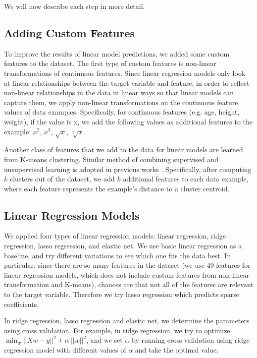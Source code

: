 \documentclass[english]{article}
\begin{document}
We will now describe each step in more detail.

\subsection{Adding Custom Features}

To improve the results of linear model predictions, we added some custom features to the dataset.
The first type of custom features is non-linear transformations of continuous features.
Since linear regression models only look at linear relationships between the target variable and feature, in order to reflect non-linear relationships in the data in linear ways so that linear models can capture them, we apply non-linear transformations on the continuous feature values of data examples.
Specifically, for continuous features (e.g. age, height, weight), if the value is x, we add the following values as additional features to the example: $x^2$, $x^3$, $\sqrt{x}$, $\sqrt[3]{x}$.

Another class of features that we add to the data for linear models are learned from K-means clustering.
Similar method of combining supervised and unsupervised learning is adopted in previous works \cite{coates2011analysis}.
Specifically, after computing $k$ clusters out of the dataset, we add $k$ additional features to each data example, where each feature represents the example's distance to a cluster centroid.

\subsection{Linear Regression Models}

We applied four types of linear regression models: linear regression, ridge regression, lasso regression, and elastic net.
We use basic linear regression as a baseline, and try different variations to see which one fits the data best.
In particular, since there are so many features in the dataset (we use 49 features for linear regression models, which does not include custom features from non-linear transformation and K-means), chances are that not all of the features are relevant to the target variable.
Therefore we try lasso regression which predicts sparse coefficients.

In ridge regression, lasso regression and elastic net, we determine the parameters using cross validation.
For example, in ridge regression, we try to optimize $\min_w || Xw - y ||^2 + \alpha\ ||w||^2$, and we set $\alpha$ by running cross validation using ridge regression model with different values of $\alpha$ and take the optimal value.
\end{document}

